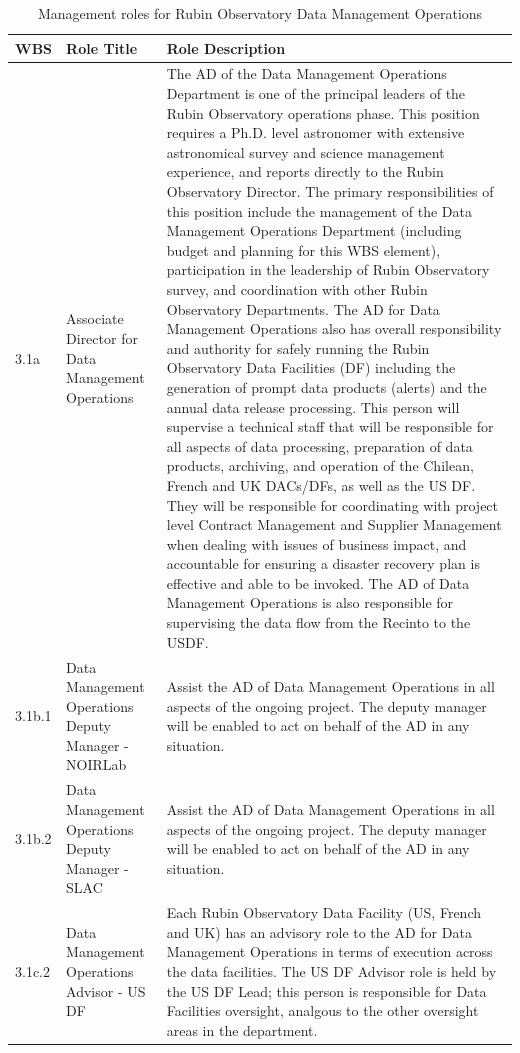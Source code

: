 \normalsize \begin{longtable} {|p{}|p{}|p{}|} \caption{Management roles for Rubin Observatory Data Management Operations \label{tab:mroles}}\\ 
\hline 
\textbf{WBS}&\textbf{Role Title}&\textbf{Role Description} \\ \hline
{3.1a}&{Associate Director for Data Management Operations}&{The AD of the Data Management Operations Department is one of the principal leaders of the Rubin Observatory operations phase. This position requires a Ph.D. level astronomer with extensive astronomical survey and science management experience, and reports directly to the Rubin Observatory Director. The primary responsibilities of this position include the management of the Data Management Operations Department (including budget and planning for this WBS element), participation in the leadership of Rubin Observatory survey, and coordination with other Rubin Observatory Departments. The AD for Data Management Operations also has overall responsibility and authority for safely running the Rubin Observatory Data Facilities (DF) including the generation of prompt data products (alerts) and the annual data release processing. This person will supervise a technical staff that will be responsible for all aspects of data processing, preparation of data products, archiving, and operation of the Chilean, French and UK DACs/DFs, as well as the US DF. They will be responsible for coordinating with project level Contract Management and Supplier Management when dealing with issues of business impact, and accountable for ensuring a disaster recovery plan is effective and able to be invoked. The AD of Data Management Operations is also responsible for supervising the data flow from the Recinto to the USDF.} \\ \hline
{3.1b.1}&{Data Management Operations Deputy Manager - NOIRLab}&{Assist the AD of Data Management Operations in all aspects of the ongoing project. The deputy manager will be enabled to act on behalf of the AD in any situation.} \\ \hline
{3.1b.2}&{Data Management Operations Deputy Manager - SLAC}&{Assist the AD of Data Management Operations in all aspects of the ongoing project. The deputy manager will be enabled to act on behalf of the AD in any situation.} \\ \hline
{3.1c.2}&{Data Management Operations Advisor - US DF}&{Each Rubin Observatory Data Facility (US, French and UK) has an advisory role to the AD for Data Management Operations in terms of execution across the data facilities.  The US DF Advisor role is held by the US DF Lead; this person is responsible for Data Facilities oversight, analgous to the other oversight areas in the department. } \\ \hline

\end{longtable}
